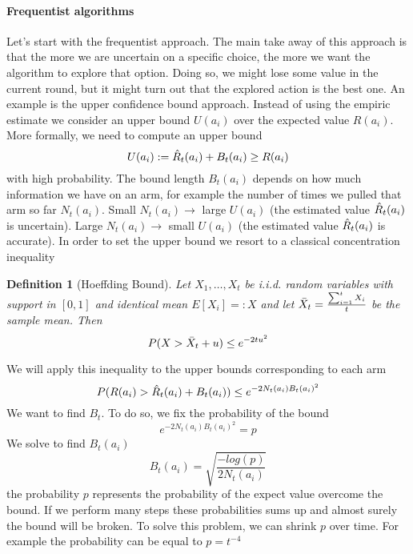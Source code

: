 \documentclass[main.tex]{subfiles}
\newtheorem{definition}{Definition}[section]
\begin{document}
\paragraph{Frequentist algorithms}
Let's start with the frequentist approach. The main take away of this approach is that the more we are uncertain on a specific choice, the more we want the algorithm to explore that option. Doing so, we might lose some value in the current round, but it might turn out that the explored action is the best one. An example is the upper confidence bound approach. Instead of using the empiric estimate we consider an upper bound $U(a_i)$
over the expected value $R(a_i)$. More formally, we need to compute an upper bound
\begin{equation*}
    U(a_i) := \Hat{R}_t(a_i) + B_t(a_i) \geq R(a_i)
\end{equation*}
with high probability. The bound length $B_t(a_i)$ depends on how much information we have on an arm, for example the number of times we pulled that arm so far $N_t(a_i)$.
Small $N_t(a_i) \rightarrow$ large $U(a_i)$ (the estimated value $\Hat{R}_t(a_i)$ is uncertain). Large $N_t(a_i) \rightarrow$ small $U(a_i)$ (the estimated value $\Hat{R}_t(a_i)$ is accurate).
In order to set the upper bound we resort to a classical concentration inequality
\begin{definition}[Hoeffding Bound]
    Let $X_1,\dots,X_t$ be i.i.d. random variables with support in $[0, 1]$ and identical mean $E[X_i] =: X$ and let $\Bar{X}_t=\frac{\sum_{i=1}^t X_i}{t}$ be the sample mean. Then
    \begin{equation*}
        P(X > \Bar{X}_t + u) \leq e^{-2tu^2}
    \end{equation*}
\end{definition}
\par \noindent
We will apply this inequality to the upper bounds corresponding to each arm
\begin{equation}
    P(R(a_i) > \Hat{R}_t(a_i) + B_t(a_i)) \leq e^{-2N_t(a_i)B_t(a_i)^2}
\end{equation}
We want to find $B_t$. To do so, we fix the probability of the bound
\begin{equation*}
    e^{-2N_t(a_i)B_t(a_i)^2} = p
\end{equation*}
We solve to find $B_t(a_i)$
\begin{equation*}
    B_t(a_i) = \sqrt{\frac{-log(p)}{2N_t(a_i)}}
\end{equation*}
the probability $p$ represents the probability of the expect value overcome the bound. If we perform many steps these probabilities sums up and almost surely the bound will be broken. To solve this problem, we can shrink $p$ over time. For example the probability can be equal to $p=t^{-4}$
\end{document}
